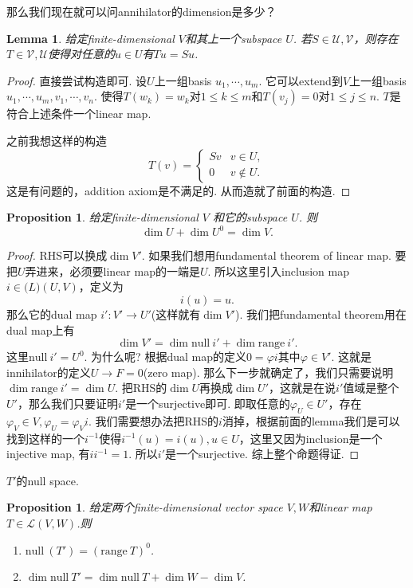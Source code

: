 \documentclass{article}
\newtheorem{lemma}[theorem]{Lemma}
\newtheorem{proposition}[theorem]{Proposition}
\newcommand*{\xfunc}[4]{{#2}\colon{#3}{#1}{#4}}
\newcommand*{\func}[3]{\xfunc{\to}{#1}{#2}{#3}}
\newcommand\nul[1]{\text{null}\ #1}
\newcommand\range[1]{\text{range}\ #1}
\begin{document}
{\color{red} 那么我们现在就可以问annihilator的dimension是多少}？ 

\begin{lemma}
\rm 给定finite-dimensional $V$和其上一个subspace $U$. 若$S \in \mathcal{U,V}$，则存在$T \in \mathcal{V,U}$使得对任意的$u \in U$有$Tu = Su$.
\end{lemma}

\begin{proof}
直接尝试构造即可. 设$U$上一组basis $u_1,\cdots,u_m$. 它可以extend到$V$上一组basis $u_1,\cdots,u_m,v_1,\cdots,v_n$. 使得$T(w_k) = w_k$对$1 \leq k \leq m$和$T(v_j) = 0$对$1 \leq j \leq n$. $T$是符合上述条件一个linear map.

之前我想这样的构造
$$
T(v)= \left\{ \begin{array}{cc}
Sv & v \in U, \\
0 & v \notin U.
\end{array} \right.
$$
这是有问题的，addition axiom是不满足的. 从而造就了前面的构造.
\end{proof}

\begin{proposition}
\rm 给定finite-dimensional $V$ 和它的subspace $U$. 则
$$
\dim U + \dim U^0 = \dim V.
$$
\end{proposition}

\begin{proof}
RHS可以换成$\dim V'$. 如果我们想用fundamental theorem of linear map. 要把$U$弄进来，必须要linear map的一端是$U$. 所以这里引入inclusion map $i \in \mathcal(L)(U,V)$，定义为
$$
i(u) = u.
$$ 
那么它的dual map $\func{i'}{V'}{U'}$(这样就有$\dim V'$). 我们把fundamental theorem用在dual map上有
$$
\dim V' = \dim\nul{i'} + \dim\range{i'}. 
$$
这里$\nul{i'} = U^0$. 为什么呢? 根据dual map的定义$0 = \varphi i$其中$\varphi \in V'$. 这就是innihilator的定义$U \rightarrow F = 0$(zero map). 那么下一步就确定了，我们只需要说明$\dim \range{i'} = \dim U$. 把RHS的$\dim U$再换成$\dim U'$，这就是在说$i'$值域是整个$U'$，那么我们只要证明$i'$是一个surjective即可. 即取任意的$\varphi_U \in U'$，存在$\varphi_V \in V, \varphi_U = \varphi_V i$. 我们需要想办法把RHS的$i$消掉，根据前面的lemma我们是可以找到这样的一个$i^{-1}$使得$i^{-1}(u) = i(u),u \in U$，这里又因为inclusion是一个injective map, 有$ii^{-1} = 1$. 所以$i'$是一个surjective. 综上整个命题得证. 
\end{proof}

{\color{red} $T'$的null space}.

\begin{proposition}
\rm 给定两个finite-dimensional vector space $V,W$和linear map $T \in \mathcal{L}(V,W)$.则
\begin{enumerate}
	\item $\nul(T') = (\range T)^0$.
	\item $\dim \nul{T'} = \dim \nul T + \dim W - \dim V$.
\end{enumerate}
\end{proposition}
\end{document}
